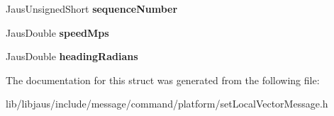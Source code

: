 \begin{DoxyCompactItemize}
\item 
\hypertarget{struct_set_local_vector_message_struct_aacd7e81092299d8aacd7ff0b3986b8bb}{\-Jaus\-Unsigned\-Short {\bfseries sequence\-Number}}\label{struct_set_local_vector_message_struct_aacd7e81092299d8aacd7ff0b3986b8bb}

\item 
\hypertarget{struct_set_local_vector_message_struct_addbfc06056c26feeedd69ee60bc9e6c4}{\-Jaus\-Double {\bfseries speed\-Mps}}\label{struct_set_local_vector_message_struct_addbfc06056c26feeedd69ee60bc9e6c4}

\item 
\hypertarget{struct_set_local_vector_message_struct_a5dcdbee6c0615c6e4368f9cdc36b89bf}{\-Jaus\-Double {\bfseries heading\-Radians}}\label{struct_set_local_vector_message_struct_a5dcdbee6c0615c6e4368f9cdc36b89bf}

\end{DoxyCompactItemize}


\-The documentation for this struct was generated from the following file\-:\begin{DoxyCompactItemize}
\item 
lib/libjaus/include/message/command/platform/set\-Local\-Vector\-Message.\-h\end{DoxyCompactItemize}
